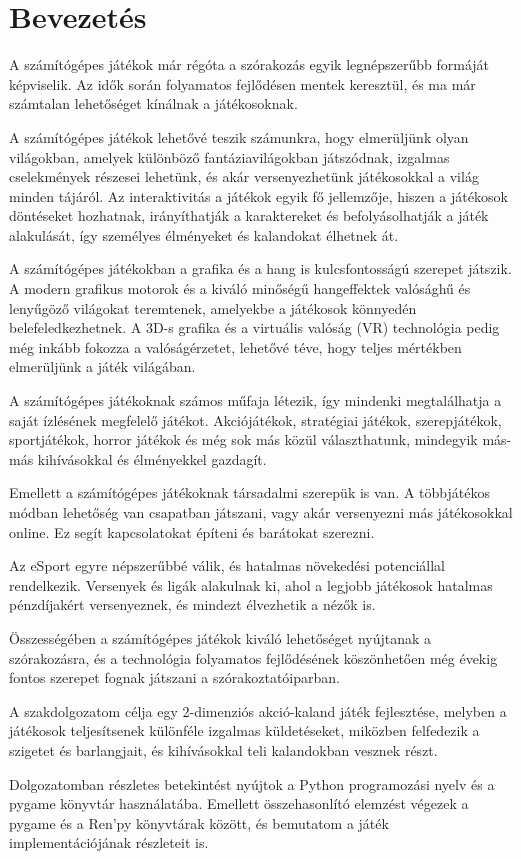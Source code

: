 \chapter{Bevezetés}

A számítógépes játékok már régóta a szórakozás egyik legnépszerűbb formáját képviselik. Az idők során folyamatos fejlődésen mentek keresztül, és ma már számtalan lehetőséget kínálnak a játékosoknak.

A számítógépes játékok lehetővé teszik számunkra, hogy elmerüljünk olyan világokban, amelyek különböző fantáziavilágokban játszódnak, izgalmas cselekmények részesei lehetünk, és akár versenyezhetünk játékosokkal a világ minden tájáról. Az interaktivitás a játékok egyik fő jellemzője, hiszen a játékosok döntéseket hozhatnak, irányíthatják a karaktereket és befolyásolhatják a játék alakulását, így személyes élményeket és kalandokat élhetnek át.

A számítógépes játékokban a grafika és a hang is kulcsfontosságú szerepet játszik. A modern grafikus motorok és a kiváló minőségű hangeffektek valósághű és lenyűgöző világokat teremtenek, amelyekbe a játékosok könnyedén belefeledkezhetnek. A 3D-s grafika és a virtuális valóság (VR) technológia pedig még inkább fokozza a valóságérzetet, lehetővé téve, hogy teljes mértékben elmerüljünk a játék világában.

A számítógépes játékoknak számos műfaja létezik, így mindenki megtalálhatja a saját ízlésének megfelelő játékot. Akciójátékok, stratégiai játékok, szerepjátékok, sportjátékok, horror játékok és még sok más közül választhatunk, mindegyik más-más kihívásokkal és élményekkel gazdagít.

Emellett a számítógépes játékoknak társadalmi szerepük is van. A többjátékos módban lehetőség van csapatban játszani, vagy akár versenyezni más játékosokkal online. Ez segít kapcsolatokat építeni és barátokat szerezni.

Az eSport egyre népszerűbbé válik, és hatalmas növekedési potenciállal rendelkezik. Versenyek és ligák alakulnak ki, ahol a legjobb játékosok hatalmas pénzdíjakért versenyeznek, és mindezt élvezhetik a nézők is.

Összességében a számítógépes játékok kiváló lehetőséget nyújtanak a szórakozásra, és a technológia folyamatos fejlődésének köszönhetően még évekig fontos szerepet fognak játszani a szórakoztatóiparban.

A szakdolgozatom célja egy 2-dimenziós akció-kaland játék fejlesztése, melyben a játékosok teljesítsenek különféle izgalmas küldetéseket, miközben felfedezik a szigetet és barlangjait, és kihívásokkal teli kalandokban vesznek részt.

Dolgozatomban részletes betekintést nyújtok a Python programozási nyelv és a pygame könyvtár használatába. Emellett összehasonlító elemzést végezek a pygame és a Ren'py könyvtárak között, és bemutatom a játék implementációjának részleteit is.